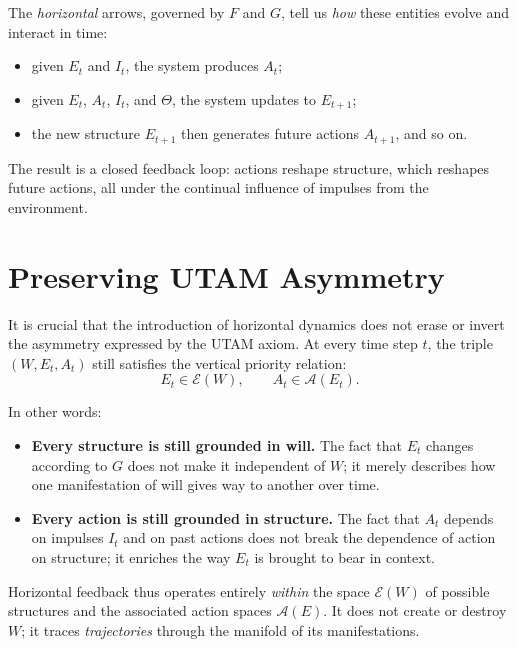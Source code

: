\documentclass[12pt,a4paper]{report}
\newcommand{\Will}{W}
\begin{document}
The \emph{horizontal} arrows, governed by \(F\) and \(G\), tell us \emph{how} these entities evolve and interact in time:

\begin{itemize}[leftmargin=2em]
    \item given \(E_t\) and \(I_t\), the system produces \(A_t\);
    \item given \(E_t\), \(A_t\), \(I_t\), and \(\Theta\), the system updates to \(E_{t+1}\);
    \item the new structure \(E_{t+1}\) then generates future actions \(A_{t+1}\), and so on.
\end{itemize}

The result is a closed feedback loop: actions reshape structure, which reshapes future actions, all under the continual influence of impulses from the environment.

\section{Preserving UTAM Asymmetry}

It is crucial that the introduction of horizontal dynamics does not erase or invert the asymmetry expressed by the UTAM axiom. At every time step \(t\), the triple \((\Will, E_t, A_t)\) still satisfies the vertical priority relation:
\[
    E_t \in \mathcal{E}(\Will), \qquad A_t \in \mathcal{A}(E_t).
\]

In other words:

\begin{itemize}[leftmargin=2em]
    \item \textbf{Every structure is still grounded in will.} The fact that \(E_t\) changes according to \(G\) does not make it independent of \(\Will\); it merely describes how one manifestation of will gives way to another over time.
    \item \textbf{Every action is still grounded in structure.} The fact that \(A_t\) depends on impulses \(I_t\) and on past actions does not break the dependence of action on structure; it enriches the way \(E_t\) is brought to bear in context.
\end{itemize}

Horizontal feedback thus operates entirely \emph{within} the space \(\mathcal{E}(\Will)\) of possible structures and the associated action spaces \(\mathcal{A}(E)\). It does not create or destroy \(\Will\); it traces \emph{trajectories} through the manifold of its manifestations.
\end{document}
